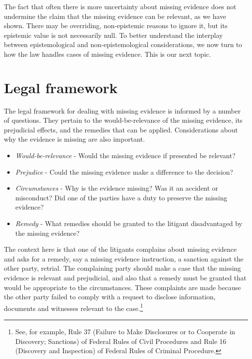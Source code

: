 \documentclass[
  10pt,
  dvipsnames,enabledeprecatedfontcommands]{scrartcl}
\begin{document}
The fact that often there is more uncertainty about missing evidence
does not undermine the claim that the missing evidence can be relevant,
as we have shown. There may be overriding, non-epistemic reasons to
ignore it, but its epistemic value is not necessarily null. To better
understand the interplay between epistemological and non-epistemological
considerations, we now turn to how the law handles cases of missing
evidence. This is our next topic.

\hypertarget{legal-framework}{%
\section{Legal framework}\label{legal-framework}}

\label{sec:legal-framework}

The legal framework for dealing with missing evidence is informed by a
number of questions. They pertain to the would-be-relevance of the
missing evidence, its prejudicial effects, and the remedies that can be
applied. Considerations about why the evidence is missing are also
important.

\begin{itemize}
\item[] \textit{Would-be-relevance} - Would the missing evidence if presented be relevant?
\item[] \textit{Prejudice} - Could the missing evidence make a difference to the decision?
\item[] \textit{Circumstances} - Why is the evidence missing? Was it an accident or misconduct? Did one of the parties have a duty to preserve the missing evidence?
\item[] \textit{Remedy} - What remedies should be granted to the litigant disadvantaged 
by the missing evidence?
\end{itemize}

\noindent The context here is that one of the litigants complains about
missing evidence and asks for a remedy, say a missing evidence
instruction, a sanction against the other party, retrial. The
complaining party should make a case that the missing evidence is
relevant and prejudicial, and also that a remedy must be granted that
would be appropriate to the circumstances. These complaints are made
because the other party failed to comply with a request to disclose
information, documents and witnesses relevant to the case.\footnote{See,
  for example, Rule 37 (Failure to Make Disclosures or to Cooperate in
  Discovery; Sanctions) of Federal Rules of Civil Procedures and Rule 16
  (Discovery and Inspection) of Federal Rules of Criminal Procedure.}
\end{document}
